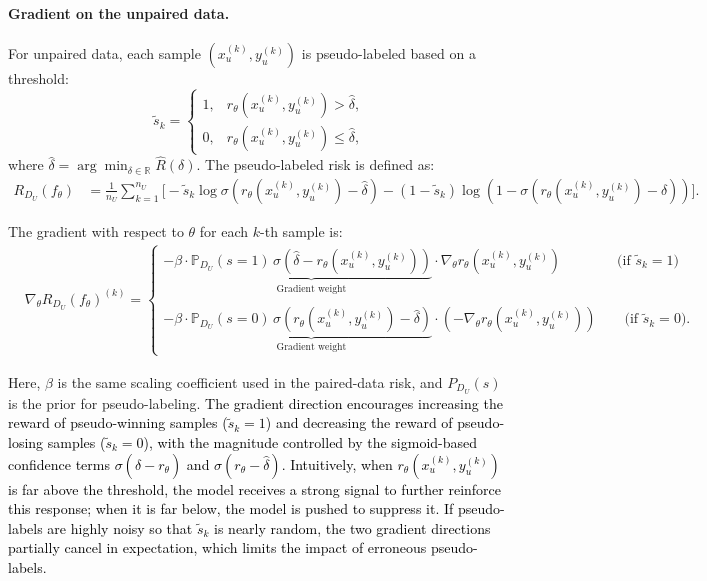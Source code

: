 \documentclass{article} %
\newcommand\rebuttal[1]{\textcolor{black}{#1}}
\begin{document}
\paragraph{Gradient on the unpaired data.}  
For unpaired data, each sample $(x_u^{(k)},y_u^{(k)})$ is pseudo-labeled based on a threshold:
\begin{equation*}
\tilde{s}_k = 
\begin{cases}
1, & r_\theta(x_u^{(k)},y_u^{(k)}) > \hat{\delta}, \\
0, & r_\theta(x_u^{(k)},y_u^{(k)}) \le \hat{\delta},
\end{cases}
\end{equation*}
where $\hat{\delta} = \arg\min_{\delta\in\mathbb{R}} \hat{R}(\delta)$. The pseudo-labeled risk is defined as:
\begin{align*}
R_{D_U}(f_\theta) &= \frac{1}{n_U} \sum_{k=1}^{n_U} \Big[
-\tilde{s}_k \log \sigma\left(r_\theta(x_u^{(k)}, y_u^{(k)}) - \hat{\delta}\right) - (1 - \tilde{s}_k) \log \left(1 - \sigma\left(r_\theta(x_u^{(k)}, y_u^{(k)}) - \hat{\delta}\right)\right) \Big].
\end{align*}

The gradient with respect to $\theta$ for each $k$-th sample is:
\begin{align*}
&\nabla_\theta R_{D_U}(f_\theta)^{(k)} = 
\begin{cases}
-\beta \cdot \underbrace{\mathbb{P}_{D_U}(s=1)\, \sigma(\hat{\delta} - r_\theta(x_u^{(k)},y_u^{(k)}))}_{\text{Gradient weight}} \cdot \nabla_\theta r_\theta(x_u^{(k)},y_u^{(k)}) \qquad \qquad \text{(if } \tilde{s}_k = 1) \\ \\
-\beta \cdot \underbrace{\mathbb{P}_{D_U}(s=0)\, \sigma(r_\theta(x_u^{(k)},y_u^{(k)}) - \hat{\delta})}_{\text{Gradient weight}} \cdot \left(-\nabla_\theta r_\theta(x_u^{(k)},y_u^{(k)})\right) \qquad \text{(if } \tilde{s}_k = 0).
\end{cases}
\end{align*}

Here, $\beta$ is the same scaling coefficient used in the paired-data risk, and $P_{D_U}(s)$ is the prior for pseudo-labeling. \rebuttal{The gradient direction encourages increasing the reward of pseudo-winning samples ($\tilde{s}_k = 1$) and decreasing the reward of pseudo-losing samples ($\tilde{s}_k = 0$), with the magnitude controlled by the sigmoid-based confidence terms $\sigma(\hat{\delta} - r_\theta)$ and $\sigma(r_\theta - \hat{\delta})$. Intuitively, when $r_\theta(x_u^{(k)},y_u^{(k)})$ is far above the threshold, the model receives a strong signal to further reinforce this response; when it is far below, the model is pushed to suppress it. If pseudo-labels are highly noisy so that $\tilde{s}_k$ is nearly random, the two gradient directions partially cancel in expectation, which limits the impact of erroneous pseudo-labels.}
\end{document}
